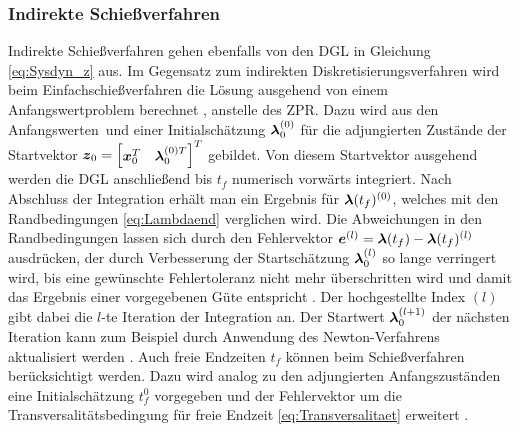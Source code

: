 \subsubsection{Indirekte Schießverfahren}\label{subsubsec:Schießverfahren_indirekt}
Indirekte Schießverfahren gehen ebenfalls von den \gls{DGL} in Gleichung \eqref{eq:Sysdyn_z} aus. Im Gegensatz zum indirekten Diskretisierungsverfahren wird beim Einfachschießverfahren die Lösung ausgehend von einem Anfangswertproblem berechnet \cite{Papageorgiou.2012}, anstelle des \gls{ZPR}. Dazu wird aus den Anfangswerten \xzero\,und einer Initialschätzung $\boldsymbol{\lambda}_0^{(0)}$ für die adjungierten Zustände der Startvektor $\boldsymbol{z}_0 = \begin{bmatrix}\boldsymbol{x}_0^T & \boldsymbol{\lambda}_0^{(0)T}\end{bmatrix}^T$ gebildet. Von diesem Startvektor ausgehend werden die \gls{DGL} anschließend bis $t_f$ numerisch vorwärts integriert. Nach Abschluss der Integration erhält man ein Ergebnis für $\boldsymbol{\lambda}(t_f)^{(0)}$, welches mit den Randbedingungen \eqref{eq:Lambdaend} verglichen wird. Die Abweichungen in den Randbedingungen lassen sich durch den Fehlervektor $\boldsymbol{e}^{(l)} = \boldsymbol{\lambda}(t_f) - \boldsymbol{\lambda}(t_f)^{(l)}$ ausdrücken, der durch Verbesserung der Startschätzung $\boldsymbol{\lambda}_0^{(l)}$ so lange verringert wird, bis eine gewünschte Fehlertoleranz nicht mehr überschritten wird und damit das Ergebnis einer vorgegebenen Güte entspricht \cite{Papageorgiou.2012}. Der hochgestellte Index $(l)$ gibt dabei die $l$-te Iteration der Integration an. Der Startwert $\boldsymbol{\lambda}_0^{(l+1)}$ der nächsten Iteration kann zum Beispiel durch Anwendung des Newton-Verfahrens aktualisiert werden \cite{Papageorgiou.2012}.
Auch freie Endzeiten $t_f$ können beim Schießverfahren berücksichtigt werden. Dazu wird analog zu den adjungierten Anfangszuständen eine Initialschätzung $t_f^{0}$ vorgegeben und der Fehlervektor um die Transversalitätsbedingung für freie Endzeit \eqref{eq:Transversalitaet} erweitert \cite{Papageorgiou.2012}.
